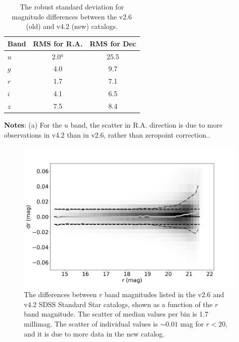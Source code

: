 \documentclass[fleqn,usenatbib]{mnras}
\begin{document}
\begin{table}
	\centering
	\caption{The robust standard deviation for magnitude differences between the v2.6 (old) and v4.2 (new) catalogs.}
	\label{tab:oldnewRMS}
	\begin{tabular}{l|c|c} %
		\hline
		Band & RMS for R.A. & RMS for Dec \\
		\hline
       $u$        &        2.0$^a$    &    25.5      \\
       $g$        &        4.0    &      9.7      \\  
       $r$         &        1.7    &      7.1      \\  
       $i$         &        4.1    &      6.5      \\ 
       $z$        &        7.5    &      8.4      \\ 
		\hline
	\end{tabular}
     \vspace{1ex}

     {\raggedright {\bf Notes}: (a) For the $u$ band, the scatter in R.A. direction is due to more observations in v4.2 than in v2.6, rather than zeropoint correction.. \par}
\end{table}


\begin{figure}
    \centering\includegraphics[width=0.95\columnwidth]{figures/testV26vsV42_r_dr_r_mag_Hess.png} 
\caption{The differences between $r$ band magnitudes listed in the v2.6 and v4.2 
SDSS Standard Star catalogs,  shown as a function of the $r$ band magnitude. The 
scatter of median values per bin is 1.7 millimag. The scatter of individual values is 
$\sim0.01$ mag for $r<20$, and it is due to more data in the new catalog.} 
\label{fig:v26v34drr}
\end{figure}
\end{document}
